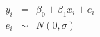\begin{equation}
	\begin{array}{ccc}
		y_i & =    & \beta_0 + \beta_1 x_i +e_i \\
		e_i & \sim & N(0,\sigma)
	\end{array}
	\label{eq24_04}
\end{equation}
